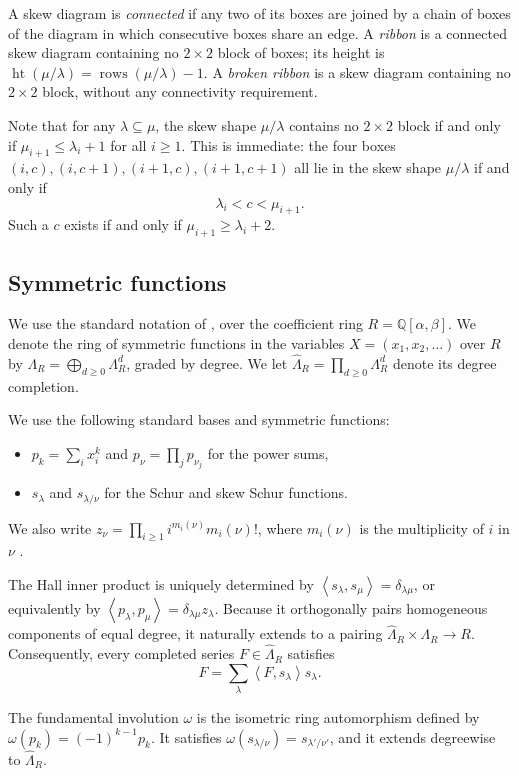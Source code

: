 \documentclass[11pt]{amsart}
\numberwithin{equation}{section}
\theoremstyle{definition}
\theoremstyle{remark}
\newcommand{\Lam}{\Lambda}
\newcommand{\rows}{\operatorname{rows}}
\newcommand{\hgt}{\operatorname{ht}}
\newcommand{\Hall}[2]{\left\langle #1,#2\right\rangle}
\newcommand{\QQ}{\mathbb Q}
\begin{document}
A skew diagram is \emph{connected} if any two of its boxes are joined by a
chain of boxes of the diagram in which consecutive boxes share an edge. A
\emph{ribbon} is a connected skew diagram containing no $2\times2$ block of
boxes; its height is $\hgt(\mu/\lambda)=\rows(\mu/\lambda)-1$. A
\emph{broken ribbon} is a skew diagram containing no $2\times2$ block,
without any connectivity requirement.

Note that for any $\lambda\subseteq\mu$, the skew shape $\mu/\lambda$ contains no $2\times2$ block if and only if $\mu_{i+1}\leq\lambda_i+1$ for all $i\geq1$. This is immediate: the four boxes $(i,c), (i,c+1), (i+1,c), (i+1,c+1)$ all lie in the skew shape $\mu/\lambda$ if and only if 
\[
 \lambda_i < c < \mu_{i+1}.
\]
Such a $c$ exists if and only if
$\mu_{i+1}\geq\lambda_i+2$.

\subsection{Symmetric functions}\label{subsec:symmetric}

We use the standard notation of \cite[Ch.~I]{Macdonald}, over the coefficient ring $R=\QQ[\alpha,\beta]$. We denote the ring of symmetric functions in the variables $X=(x_1,x_2,\dots)$ over $R$ by $\Lam_R=\bigoplus_{d\geq0}\Lam_R^d$, graded by degree. We let $\widehat{\Lam}_R=\prod_{d\geq0}\Lam_R^d$ denote its degree completion. 

We use the following standard bases and symmetric functions:
\begin{itemize}
    \item $p_k=\sum_ix_i^k$ and $p_\nu=\prod_jp_{\nu_j}$ for the power sums,
    \item $s_\lambda$ and $s_{\lambda/\nu}$ for the Schur and skew Schur functions.
\end{itemize}
We also write $z_\nu=\prod_{i\geq1}i^{m_i(\nu)}m_i(\nu)!$, where $m_i(\nu)$ is the multiplicity of $i$ in $\nu$ \cite{Macdonald}.

The Hall inner product is uniquely determined by $\Hall{s_\lambda}{s_\mu}=\delta_{\lambda\mu}$, or equivalently by $\Hall{p_\lambda}{p_\mu}=\delta_{\lambda\mu}z_\lambda$. Because it orthogonally pairs homogeneous components of equal degree, it naturally extends to a pairing $\widehat{\Lam}_R\times\Lam_R\to R$. Consequently, every completed series $F\in\widehat{\Lam}_R$ satisfies 
\[
 F=\sum_\lambda\Hall{F}{s_\lambda}s_\lambda.
\]

The fundamental involution $\omega$ is the isometric ring automorphism defined by $\omega(p_k)=(-1)^{k-1}p_k$. It satisfies $\omega(s_{\lambda/\nu})=s_{\lambda'/\nu'}$, and it extends degreewise to $\widehat{\Lam}_R$.
\end{document}

